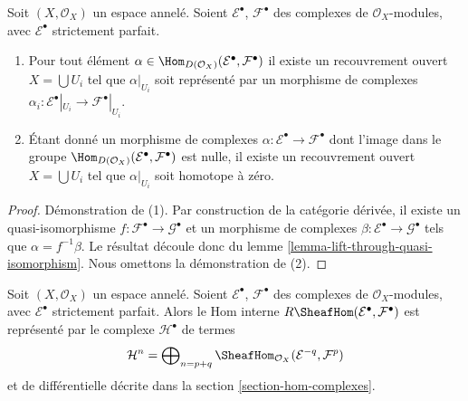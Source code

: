 \begin{lemma}

\label{lemma-local-actual}

Soit $(X, \mathcal{O}_X)$ un espace annelé. Soient $\mathcal{E}^\bullet$, $\mathcal{F}^\bullet$ des complexes de $\mathcal{O}_X$-modules, avec $\mathcal{E}^\bullet$ strictement parfait.

\begin{enumerate}

\item Pour tout élément
$\alpha \in \Hom_{D(\mathcal{O}_X)}(\mathcal{E}^\bullet, \mathcal{F}^\bullet)$
il existe un recouvrement ouvert $X = \bigcup U_i$ tel que
$\alpha|_{U_i}$ soit représenté par un morphisme de complexes
$\alpha_i : \mathcal{E}^\bullet|_{U_i} \to \mathcal{F}^\bullet|_{U_i}$.
\item Étant donné un morphisme de complexes
$\alpha : \mathcal{E}^\bullet \to \mathcal{F}^\bullet$
dont l'image dans le groupe
$\Hom_{D(\mathcal{O}_X)}(\mathcal{E}^\bullet, \mathcal{F}^\bullet)$
est nulle, il existe un recouvrement ouvert $X = \bigcup U_i$ tel que
$\alpha|_{U_i}$ soit homotope à zéro.

\end{enumerate}

\end{lemma}

\begin{proof}
Démonstration de (1). Par construction de la catégorie dérivée, il existe un quasi-isomorphisme $f : \mathcal{F}^\bullet \to \mathcal{G}^\bullet$ et un morphisme de complexes $\beta : \mathcal{E}^\bullet \to \mathcal{G}^\bullet$ tels que $\alpha = f^{-1}\beta$. Le résultat découle donc du lemme \ref{lemma-lift-through-quasi-isomorphism}. Nous omettons la démonstration de (2).
\end{proof}

\begin{lemma}

\label{lemma-Rhom-strictly-perfect}
Soit $(X, \mathcal{O}_X)$ un espace annelé. Soient $\mathcal{E}^\bullet$, $\mathcal{F}^\bullet$ des complexes de $\mathcal{O}_X$-modules, avec $\mathcal{E}^\bullet$ strictement parfait. Alors le Hom interne $R\SheafHom(\mathcal{E}^\bullet, \mathcal{F}^\bullet)$ est représenté par le complexe $\mathcal{H}^\bullet$ de termes $$
\mathcal{H}^n =
\bigoplus\nolimits_{n = p + q}
\SheafHom_{\mathcal{O}_X}(\mathcal{E}^{-q}, \mathcal{F}^p)
$$ et de différentielle décrite dans la section \ref{section-hom-complexes}.
\end{lemma}

